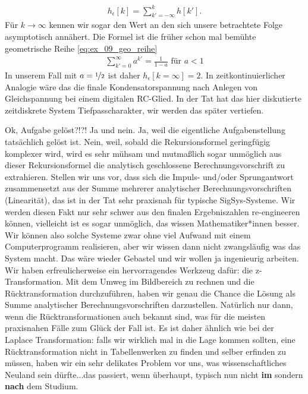 \begin{Ansatz}
\begin{align}
h_\epsilon[k] = \sum_{k'=-\infty}^{k} h[k'].
\end{align}
%
Für $k \to \infty$ kennen wir sogar den Wert an den sich unsere betrachtete Folge
asymptotisch annähert. Die Formel ist die früher schon mal bemühte
geometrische Reihe \eqref{eq:ex_09_geo_reihe}
\begin{align}
\sum_{k'=0}^{\infty} a^{k'} = \frac{1}{1-a}\text{ für } a<1
\end{align}
In unserem Fall mit $a=\nicefrac{1}{2}$ ist daher $h_\epsilon[k=\infty] = 2$.
In zeitkontinuierlicher Analogie wäre das die finale Kondensatorspannung
nach Anlegen von Gleichspannung bei einem digitalen RC-Glied. In der Tat hat
das hier diskutierte zeitdiskrete System Tiefpasscharakter,
wir werden das später vertiefen.

Ok, Aufgabe gelöst?!?! Ja und nein. Ja, weil die eigentliche Aufgabenstellung
tatsächlich gelöst ist. Nein, weil, sobald die Rekursionsformel geringfügig
komplexer wird, wird es sehr mühsam und mutmaßlich sogar unmöglich aus dieser
Rekursionsformel die analytisch geschlossene Berechnungsvorschrift zu extrahieren.
Stellen wir uns vor, dass sich die Impuls- und/oder Sprungantwort zusammensetzt
aus der Summe mehrerer analytischer Berechnungsvorschriften (Linearität),
das ist in der Tat sehr praxisnah für typische SigSys-Systeme. Wir werden diesen
Fakt nur sehr schwer aus den finalen Ergebniszahlen re-engineeren können, vielleicht
ist es sogar unmöglich, das wissen Mathematiker*innen besser.
Wir können also solche Systeme zwar ohne viel Aufwand mit einem Computerprogramm
realisieren, aber wir wissen dann nicht zwangsläufig was das System macht.
Das wäre wieder Gebastel und wir wollen ja ingenieurig arbeiten.
%
Wir haben erfreulicherweise ein hervorragendes Werkzeug dafür: die z-Transformation.
Mit dem Umweg im Bildbereich zu rechnen und die Rücktransformation durchzuführen,
haben wir genau die Chance die Lösung als Summe analytischer Berechnungsvorschriften
darzustellen. Natürlich nur dann, wenn die Rücktransformationen auch bekannt sind,
was für die meisten praxisnahen Fälle zum Glück der Fall ist. Es ist daher ähnlich
wie bei der Laplace Transformation: falls wir wirklich mal in die Lage kommen
sollten, eine Rücktransformation nicht in Tabellenwerken zu finden und selber
erfinden zu müssen, haben wir ein sehr delikates Problem vor uns, was
wissenschaftliches Neuland sein dürfte...das passiert, wenn überhaupt,
typisch nun nicht \textbf{im} sondern \textbf{nach} dem Studium.
\end{Ansatz}
